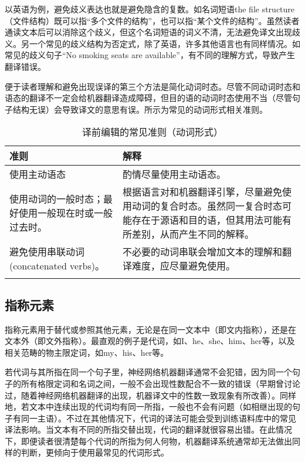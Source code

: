 \documentclass[output=paper,colorlinks,citecolor=brown]{langscibook}
\begin{document}
以英语为例，避免歧义表达也就是避免隐含的复数。如名词短语the file structure（文件结构）既可以指“多个文件的结构”，也可以指“某个文件的结构”。虽然读者通读文本后可以消除这个歧义，但这个名词短语的词义不清，无法避免译文出现歧义。另一个常见的歧义结构为否定式，除了英语，许多其他语言也有同样情况。如常见的歧义句子“No smoking seats are available”，有不同的理解方式，导致产生翻译错误。

便于读者理解和避免出现误译的第三个方法是简化动词时态。尽管不同动词时态和语态的翻译不一定会给机器翻译造成障碍，但目的语的动词时态使用不当（尽管句子结构无误）会导致译文的意思有误。所示为常见的动词形式相关准则。

\begin{table}
\begin{tabularx}{\textwidth}{QQ}
\lsptoprule
{准则} & {解释}\\
\midrule
使用主动语态 & 酌情尽量使用主动语态。\\
\tablevspace

\raggedright
使用动词的一般时态；最好使用一般现在时或一般过去时。& 根据语言对和机器翻译引擎，尽量避免使用动词的复合时态。虽然同一复合时态可能存在于源语和目的语，但其用法可能有所差别，从而产生不同的解释。\\
\tablevspace

避免使用串联动词(concatenated verbs)。& 不必要的动词串联会增加文本的理解和翻译难度，应尽量避免使用。\\
\lspbottomrule
\end{tabularx}
\caption{译前编辑的常见准则（动词形式）}
\label{tab:sanchez:3}
\end{table}

\subsection{指称元素}\label{sec:sanchez:6.4}

指称元素用于替代或参照其他元素，无论是在同一文本中（即文内指称），还是在文本外（即文外指称）。最直观的例子是代词，如I、he、she、him、her等，以及相关范畴的物主限定词，如my、his、her等。

若代词与其所指在同一个句子里，神经网络机器翻译通常不会犯错，因为同一个句子的所有格限定词和名词之间，一般不会出现性数配合不一致的错误（\citet{Bentivogli2016}早期曾讨论过，随着神经网络机器翻译的出现，机器译文中的性数一致现象有所改善）。同样地，若文本中连续出现的代词均有同一所指，一般也不会有问题（如相继出现的句子有同一主语）。不过在其他情况下，代词的译法可能会受到训练语料库中的常见译法影响。当文本有不同的所指交替出现，代词的翻译就很容易出错。在此情况下，即便读者很清楚每个代词的所指为何人何物，机器翻译系统通常却无法做出同样的判断，更倾向于使用最常见的代词形式。
\end{document}
